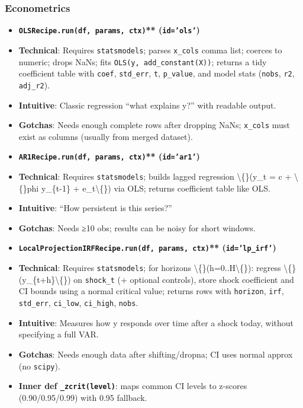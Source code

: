 \documentclass[11pt]{article}
\begin{document}
\subsubsection{Econometrics}

\begin{itemize}[leftmargin=*,nosep]
\item \textbf{\texttt{OLSRecipe.run(df, params, ctx)}** (\texttt{id='ols'})}
\item \textbf{Technical}: Requires \texttt{statsmodels}; parses \texttt{x\_cols} comma list; coerces to numeric; drops NaNs; fits \texttt{OLS(y, add\_constant(X))}; returns a tidy coefficient table with \texttt{coef}, \texttt{std\_err}, \texttt{t}, \texttt{p\_value}, and model stats (\texttt{nobs}, \texttt{r2}, \texttt{adj\_r2}).
\item \textbf{Intuitive}: Classic regression “what explains y?” with readable output.
\item \textbf{Gotchas}: Needs enough complete rows after dropping NaNs; \texttt{x\_cols} must exist as columns (usually from merged dataset).
\item \textbf{\texttt{AR1Recipe.run(df, params, ctx)}** (\texttt{id='ar1'})}
\item \textbf{Technical}: Requires \texttt{statsmodels}; builds lagged regression \textbackslash\{\}(y\_t = c + \textbackslash\{\}phi y\_\{t-1\} + e\_t\textbackslash\{\}) via OLS; returns coefficient table like OLS.
\item \textbf{Intuitive}: “How persistent is this series?”
\item \textbf{Gotchas}: Needs ≥10 obs; results can be noisy for short windows.
\item \textbf{\texttt{LocalProjectionIRFRecipe.run(df, params, ctx)}** (\texttt{id='lp\_irf'})}
\item \textbf{Technical}: Requires \texttt{statsmodels}; for horizons \textbackslash\{\}(h=0..H\textbackslash\{\}): regress \textbackslash\{\}(y\_\{t+h\}\textbackslash\{\}) on \texttt{shock\_t} (+ optional controls), store shock coefficient and CI bounds using a normal critical value; returns rows with \texttt{horizon}, \texttt{irf}, \texttt{std\_err}, \texttt{ci\_low}, \texttt{ci\_high}, \texttt{nobs}.
\item \textbf{Intuitive}: Measures how y responds over time after a shock today, without specifying a full VAR.
\item \textbf{Gotchas}: Needs enough data after shifting/dropna; CI uses normal approx (no \texttt{scipy}).
\item \textbf{Inner def \texttt{\_zcrit(level)}}: maps common CI levels to z-scores (0.90/0.95/0.99) with 0.95 fallback.
\end{itemize}
\end{document}

